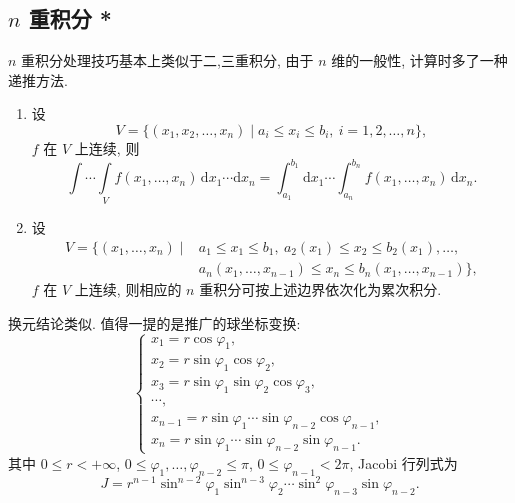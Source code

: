 \subsection{\texorpdfstring{$n$}{n} 重积分 *}

$n$ 重积分处理技巧基本上类似于二,三重积分, 由于 $n$ 维的一般性, 计算时多了一种递推方法.

\begin{theorem}
    \leavevmode
    \begin{enumerate}
        \item 设
              \[
                  V=\{(x_1,x_2,\ldots,x_n)\mid a_i\leq x_i\leq b_i,\ i=1,2,\ldots,n\},
              \]
              $f$ 在 $V$ 上连续, 则
              \[
                  \displaystyle\int\cdots\int\limits_V f(x_1,\ldots,x_n)\,\mathrm{d}x_1\cdots\mathrm{d}x_n
                  =\int_{a_1}^{b_1}\mathrm{d}x_1\cdots\int_{a_n}^{b_n}f(x_1,\ldots,x_n)\,\mathrm{d}x_n.
              \]

        \item 设
              \[
                  \begin{aligned}
                      V=\{(x_1,\ldots,x_n)\mid{} & a_1\leq x_1\leq b_1,\ a_2(x_1)\leq x_2\leq b_2(x_1),\ldots,    \\
                                                 & a_n(x_1,\ldots,x_{n-1})\leq x_n\leq b_n(x_1,\ldots,x_{n-1})\},
                  \end{aligned}
              \]
              $f$ 在 $V$ 上连续, 则相应的 $n$ 重积分可按上述边界依次化为累次积分.
    \end{enumerate}
\end{theorem}

换元结论类似. 值得一提的是推广的球坐标变换:
\[
    \begin{cases}
        x_1=r\cos\varphi_1,                                             \\
        x_2=r\sin\varphi_1\cos\varphi_2,                                \\
        x_3=r\sin\varphi_1\sin\varphi_2\cos\varphi_3,                   \\
        \cdots,                                                         \\
        x_{n-1}=r\sin\varphi_1\cdots\sin\varphi_{n-2}\cos\varphi_{n-1}, \\
        x_n=r\sin\varphi_1\cdots\sin\varphi_{n-2}\sin\varphi_{n-1}.
    \end{cases}
\]
其中 $0\leq r<+\infty$, $0\leq\varphi_1,\ldots,\varphi_{n-2}\leq\pi$, $0\leq\varphi_{n-1}<2\pi$, Jacobi 行列式为
\[
    J=r^{n-1}\sin^{n-2}\varphi_1\sin^{n-3}\varphi_2\cdots\sin^2\varphi_{n-3}\sin\varphi_{n-2}.
\]

